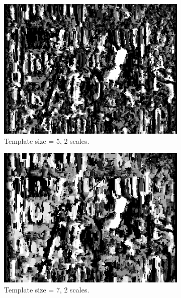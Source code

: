 \documentclass[12pt,a4paper,oneside,final]{article}
\begin{document}
\begin{figure}[H]
\ContinuedFloat
\begin{subfigure}[b]{0.24\textwidth}
	\includegraphics[width=\textwidth]{disparity_s2_k5set_1.png}
	\caption{Template size = 5, 2 scales.}
\end{subfigure}
\begin{subfigure}[b]{0.24\textwidth}
	\includegraphics[width=\textwidth]{disparity_s2_k7set_1.png}
	\caption{Template size = 7, 2 scales.}
\end{subfigure}
\begin{subfigure}[b]{0.24\textwidth}

\end{subfigure}
\end{figure}
\end{document}
